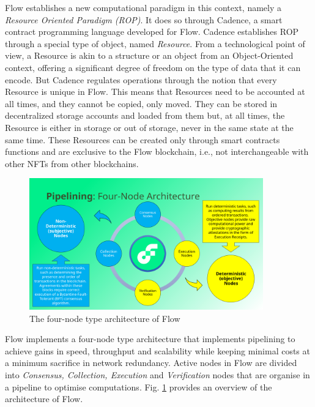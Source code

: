 \documentclass[../main.tex]{subfiles}
\begin{document}
Flow establishes a new computational paradigm in this context, namely a \textit{Resource Oriented Paradigm (ROP)}. It does so through Cadence, a smart contract programming language developed for Flow. Cadence establishes ROP through a special type of object, named \textit{Resource}. From a technological point of view, a Resource is akin to a structure or an object from an Object-Oriented context, offering a significant degree of freedom on the type of data that it can encode. But Cadence regulates operations through the notion that every Resource is unique in Flow. This means that Resources need to be accounted at all times, and they cannot be copied, only moved. They can be stored in decentralized storage accounts and loaded from them but, at all times, the Resource is either in storage or out of storage, never in the same state at the same time. These Resources can be created only through smart contracts functions and are exclusive to the Flow blockchain, i.e., not interchangeable with other NFTs from other blockchains.
\par

\begin{figure}[htp]
    \centering
    \includegraphics[width=0.9\textwidth]{../Images/03_Flow_architecture.png}
    \caption{The four-node type architecture of Flow \cite{Hentschel2019c}}
    \label{fig:flow_architecture}
\end{figure}

Flow implements a four-node type architecture that implements pipelining to achieve gains in speed, throughput and scalability while keeping minimal costs at a minimum sacrifice in network redundancy. Active nodes in Flow are divided into \textit{Consensus, Collection, Execution} and \textit{Verification} nodes that are organise in a pipeline to optimise computations. Fig. \ref{fig:flow_architecture} provides an overview of the architecture of Flow.
\end{document}
